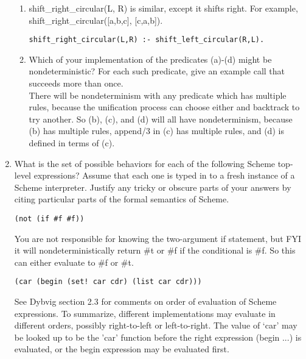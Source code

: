 \documentclass[10pt]{article}
\begin{document}
\begin{enumerate}
\begin{enumerate}
                \item shift\_right\_circular(L, R) is similar, except it shifts right. For example, shift\_right\_circular([a,b,c], [c,a,b]).\\

\begin{verbatim}
shift_right_circular(L,R) :- shift_left_circular(R,L).
\end{verbatim}

                \item Which of your implementation of the predicates (a)-(d) might be nondeterministic? For each such predicate, give
                an example call that succeeds more than once.\\

                There will be nondeterminism with any predicate which has multiple rules, because the unification process can choose
                either and backtrack to try another. So (b), (c), and (d) will all have nondeterminism, because (b) has multiple rules,
                append/3 in (c) has multiple rules, and (d) is defined in terms of (c).
        \end{enumerate}

        \item What is the set of possible behaviors for each of the following Scheme top-level expressions? Assume that each one is
        typed in to a fresh instance of a Scheme interpreter. Justify any tricky or obscure parts of your answers by citing particular
        parts of the formal semantics of Scheme.

\begin{verbatim}
(not (if #f #f))
\end{verbatim}

        You are not responsible for knowing the two-argument if statement, but FYI it will nondeterministically return \#t or \#f if
        the conditional is \#f. So this can either evaluate to \#f or \#t.

\begin{verbatim}
(car (begin (set! car cdr) (list car cdr)))
\end{verbatim}

        See Dybvig section 2.3 for comments on order of evaluation of Scheme expressions. To summarize, different implementations
        may evaluate in different orders, possibly right-to-left or left-to-right. The value of `car' may be looked up to be the
        'car' function before the right expression (begin ...) is evaluated, or the begin expression may be evaluated first.


\end{enumerate}
\end{document}
